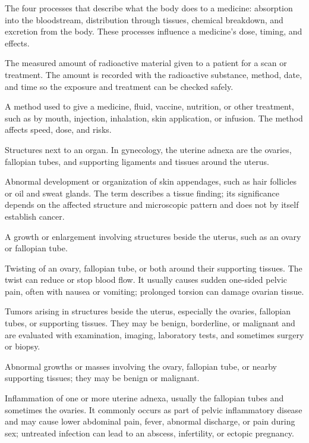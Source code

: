  The four processes that describe what the body does to a medicine: absorption into the bloodstream, distribution through tissues, chemical breakdown, and excretion from the body. These processes influence a medicine’s dose, timing, and effects.

 The measured amount of radioactive material given to a patient for a scan or treatment. The amount is recorded with the radioactive substance, method, date, and time so the exposure and treatment can be checked safely.

 A method used to give a medicine, fluid, vaccine, nutrition, or other treatment, such as by mouth, injection, inhalation, skin application, or infusion. The method affects speed, dose, and risks.

 Structures next to an organ. In gynecology, the uterine adnexa are the ovaries, fallopian tubes, and supporting ligaments and tissues around the uterus.

 Abnormal development or organization of skin appendages, such as hair follicles or oil and sweat glands. The term describes a tissue finding; its significance depends on the affected structure and microscopic pattern and does not by itself establish cancer.

 A growth or enlargement involving structures beside the uterus, such as an ovary or fallopian tube.

 Twisting of an ovary, fallopian tube, or both around their supporting tissues. The twist can reduce or stop blood flow. It usually causes sudden one-sided pelvic pain, often with nausea or vomiting; prolonged torsion can damage ovarian tissue.

 Tumors arising in structures beside the uterus, especially the ovaries, fallopian tubes, or supporting tissues. They may be benign, borderline, or malignant and are evaluated with examination, imaging, laboratory tests, and sometimes surgery or biopsy.

 Abnormal growths or masses involving the ovary, fallopian tube, or nearby supporting tissues; they may be benign or malignant.

 Inflammation of one or more uterine adnexa, usually the fallopian tubes and sometimes the ovaries. It commonly occurs as part of pelvic inflammatory disease and may cause lower abdominal pain, fever, abnormal discharge, or pain during sex; untreated infection can lead to an abscess, infertility, or ectopic pregnancy.

